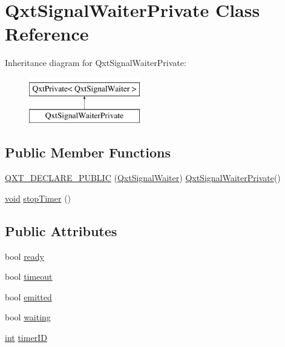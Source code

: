 \hypertarget{class_qxt_signal_waiter_private}{\section{Qxt\-Signal\-Waiter\-Private Class Reference}
\label{class_qxt_signal_waiter_private}
}
Inheritance diagram for Qxt\-Signal\-Waiter\-Private\-:\begin{figure}[H]
\begin{center}
\leavevmode
\includegraphics[height=2.000000cm]{class_qxt_signal_waiter_private}
\end{center}
\end{figure}
\subsection*{Public Member Functions}
\begin{DoxyCompactItemize}
\item 
\hyperlink{class_qxt_signal_waiter_private_a02be777a546ba6e4be813c3188e2699b}{Q\-X\-T\-\_\-\-D\-E\-C\-L\-A\-R\-E\-\_\-\-P\-U\-B\-L\-I\-C} (\hyperlink{class_qxt_signal_waiter}{Qxt\-Signal\-Waiter}) \hyperlink{class_qxt_signal_waiter_private}{Qxt\-Signal\-Waiter\-Private}()
\item 
\hyperlink{group___u_a_v_objects_plugin_ga444cf2ff3f0ecbe028adce838d373f5c}{void} \hyperlink{class_qxt_signal_waiter_private_ac01d6e699dbfc20a439f090cc82fdb94}{stop\-Timer} ()
\end{DoxyCompactItemize}
\subsection*{Public Attributes}
\begin{DoxyCompactItemize}
\item 
bool \hyperlink{class_qxt_signal_waiter_private_aa5920d5f36ba9c6cc6f3f39c5fe47aef}{ready}
\item 
bool \hyperlink{class_qxt_signal_waiter_private_a775a9d0690085d3b91ed242e6d6f5241}{timeout}
\item 
bool \hyperlink{class_qxt_signal_waiter_private_a7f384d0f03b1d7a0bac2f72b196c048b}{emitted}
\item 
bool \hyperlink{class_qxt_signal_waiter_private_ae3d0a9fd97a91f5a1c2ee2c9beb44bf2}{waiting}
\item 
\hyperlink{ioapi_8h_a787fa3cf048117ba7123753c1e74fcd6}{int} \hyperlink{class_qxt_signal_waiter_private_aa0788f635008ab144f4200abf918bdb1}{timer\-I\-D}
\end{DoxyCompactItemize}
